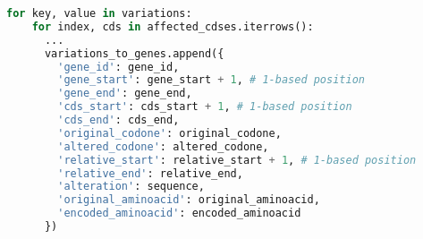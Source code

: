 \documentclass[11pt,italian]{article}
\begin{document}
\newpage
\begin{lstlisting}[language=Python,caption=Memorizzazione dei risultati nella struttura dati a lista,label=code:variation_loop]
  for key, value in variations:
    for index, cds in affected_cdses.iterrows():
      ...
      variations_to_genes.append({
        'gene_id': gene_id,
        'gene_start': gene_start + 1, # 1-based position
        'gene_end': gene_end,
        'cds_start': cds_start + 1, # 1-based position
        'cds_end': cds_end,
        'original_codone': original_codone,
        'altered_codone': altered_codone,
        'relative_start': relative_start + 1, # 1-based position
        'relative_end': relative_end,
        'alteration': sequence,
        'original_aminoacid': original_aminoacid,
        'encoded_aminoacid': encoded_aminoacid
      })
\end{lstlisting}
\end{document}
